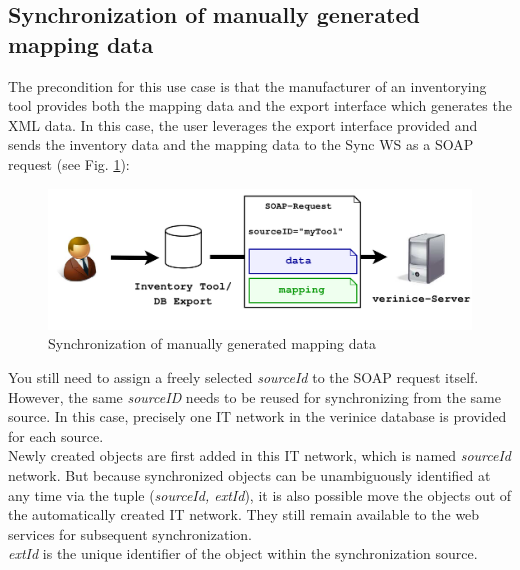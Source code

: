 \documentclass[a4paper,10pt]{book}
\begin{document}
\subsection{Synchronization of manually generated mapping data}
The precondition for this use case is that the manufacturer of an inventorying tool provides both the
mapping data and the export interface which generates the XML data. In this case, the user leverages the export
interface provided and sends the inventory data and the mapping data to the Sync WS as a SOAP request (see Fig. \ref{Synchronization of manually generated mapping data}):
\newline
\begin{figure}[htb!]
  \centering
  \includegraphics[scale=.3]{Screenshot/Use_case_db_export-en.png}
  \caption{\label{Synchronization of manually generated mapping data} Synchronization of manually generated mapping data}
\end{figure}
\newline
You still need to assign a freely selected {\em sourceId} to the SOAP request itself. However, the same \textit{sourceID}
needs to be reused for synchronizing from the same source. In this case, precisely one IT network in the verinice
database is provided for each source.
\newline\\
Newly created objects are first added in this IT network, which is named {\em sourceId} network.
But because synchronized objects can be unambiguously identified at any time via the tuple ({\em sourceId, extId}),
it is also possible move the objects out of the automatically created IT network. They still remain available to the
web services for subsequent synchronization.
\newline\\
{\em extId} is the unique identifier of the object within the synchronization source.
\end{document}
